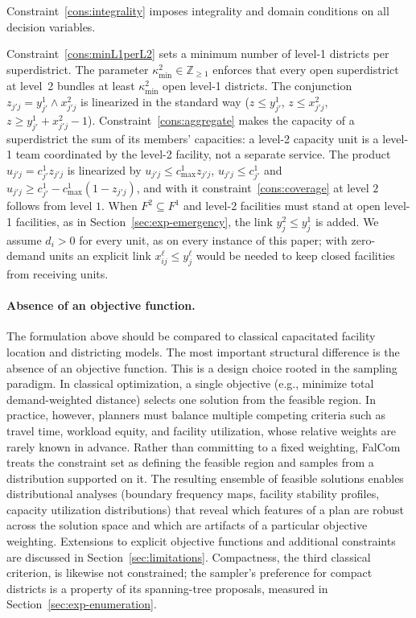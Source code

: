 \documentclass[11pt]{article}
\theoremstyle{definition}
\begin{document}
Constraint~\eqref{cons:integrality} imposes integrality
and domain conditions on all decision variables.

Constraint~\eqref{cons:minL1perL2} sets a minimum number of level-1 districts per superdistrict. The parameter $\kappa^2_{\min} \in \mathbb{Z}_{\geq
    1}$ enforces that every open superdistrict at level~2 bundles at
    least $\kappa^2_{\min}$ open level-1 districts.  The conjunction
    $z_{j'j} = y^1_{j'} \wedge x^{2}_{j'j}$ is linearized in the
    standard way ($z \leq y^1_{j'}$, $z \leq x^2_{j'j}$,
    $z \geq y^1_{j'} + x^2_{j'j} - 1$). Constraint~\eqref{cons:aggregate} makes the capacity of a superdistrict the sum of its members' capacities: a level-2 capacity unit is a level-1 team coordinated by the level-2 facility, not a separate service. The product $u_{j'j} = c^1_{j'} z_{j'j}$ is linearized by $u_{j'j} \leq c^1_{\max} z_{j'j}$, $u_{j'j} \leq c^1_{j'}$ and $u_{j'j} \geq c^1_{j'} - c^1_{\max}(1 - z_{j'j})$, and with it constraint~\eqref{cons:coverage} at level $2$ follows from level $1$. When $F^2 \subseteq F^1$ and level-2 facilities must stand at open level-1 facilities, as in Section~\ref{sec:exp-emergency}, the link $y^2_j \leq y^1_j$ is added. We assume $d_i > 0$ for every unit, as on every instance of this paper; with zero-demand units an explicit link $x^\ell_{ij} \leq y^\ell_j$ would be needed to keep closed facilities from receiving units.


\paragraph{Absence of an objective function.}
The formulation above should be compared to classical capacitated facility
location and districting models.  The most important structural difference is
the absence of an objective function.  This is a design choice
rooted in the sampling paradigm.  In classical optimization, a single objective
(e.g., minimize total demand-weighted distance) selects one solution from the
feasible region.  In practice, however, planners must balance multiple
competing criteria such as travel time, workload equity, and facility
utilization, whose relative weights are rarely known in advance.
Rather than committing to a fixed weighting, FalCom treats the constraint set
as defining the feasible region and samples from a distribution supported on
it.  The resulting ensemble of feasible solutions
enables distributional analyses (boundary frequency maps, facility stability
profiles, capacity utilization distributions) that reveal which features of a
plan are robust across the solution space and which are artifacts of a
particular objective weighting.  Extensions to
explicit objective functions and additional constraints are discussed in Section~\ref{sec:limitations}. Compactness, the third classical criterion, is likewise not constrained; the sampler's preference for compact districts is a property of its spanning-tree proposals, measured in Section~\ref{sec:exp-enumeration}.
\end{document}

